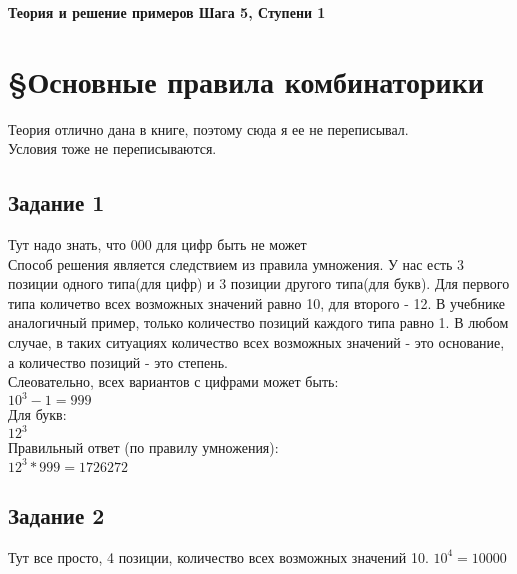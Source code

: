 \documentclass[12pt]{article}
\begin{document}
\begin{titlepage}
\begin{center}
\textbf{\huge Теория  и решение примеров Шага 5, Ступени 1}
\end{center}
\end{titlepage}
\tableofcontents
\newpage
\section{\S Основные правила комбинаторики}

Теория отлично дана в книге, поэтому сюда я ее не переписывал.\\
Условия тоже не переписываются.

\newpage
\subsection{Задание 1}

Тут надо знать, что 000 для цифр быть не может\\
Способ решения является следствием из правила умножения. У нас есть 3 позиции одного типа(для цифр) и 3 позиции другого типа(для букв). Для первого типа количетво всех возможных значений равно 10, для второго - 12. В учебнике аналогичный пример, только количество позиций каждого типа равно 1. В любом случае, в таких ситуациях  количество всех возможных значений - это основание, а количество позиций - это степень.\\
Слеовательно, всех  вариантов с цифрами может быть:\\
$10^{3}-1=999$
\\
Для букв:\\
$12^{3}$
\\
Правильный ответ (по правилу умножения):\\
$12^{3}*999=1726272$

\newpage
\subsection{Задание 2}
Тут все просто, 4 позиции,  количество всех возможных значений 10.
$10^{4}=10000$

\newpage
\end{document}

